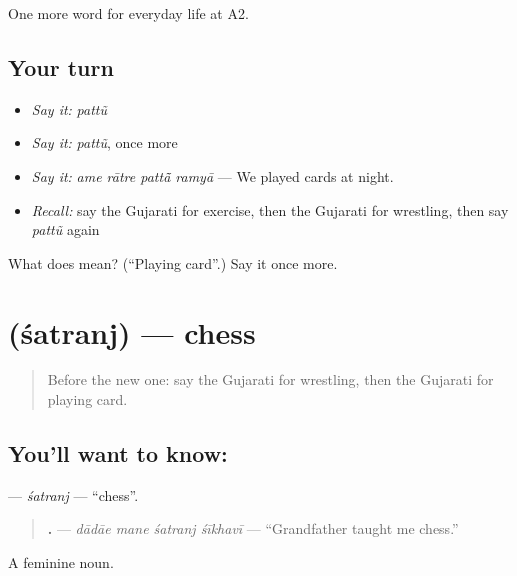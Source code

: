 \begin{grammarlens}[title={What you've built}]
One more word for everyday life at A2.
\end{grammarlens}

\subsection*{Your turn}
\begin{itemize}
\raggedright
  \item \emph{Say it:} \emph{pattũ}
  \item \emph{Say it:} \emph{pattũ}, once more
  \item \emph{Say it:} \emph{ame rātre pattā̃ ramyā} — We played cards at night.
  \item \emph{Recall:} say the Gujarati for exercise, then the Gujarati for wrestling, then say \emph{pattũ} again
\end{itemize}

\begin{tcolorbox}[breakable,colback=teal!4,colframe=teal!35!black,title={Before you move on}]
What does  mean? (\textquotedblleft{}Playing card\textquotedblright{}.) Say it once more.
\end{tcolorbox}
\section[\texorpdfstring{\gu{શતરંજ} (śatranj)}{શતરંજ (śatranj)}]{ (śatranj) — chess}

\label{lesson:GU-C260-shatranj}



\begin{quote}
Before the new one: say the Gujarati for wrestling, then the Gujarati for playing card.
\end{quote}

\subsection*{You'll want to know: }
\textbf{} — \emph{śatranj} — \textquotedblleft{}chess\textquotedblright{}.

\begin{quote}
\textbf{   .} — \emph{dādāe mane śatranj śīkhavī} — \textquotedblleft{}Grandfather taught me chess.\textquotedblright{}
\end{quote}

A feminine noun.

